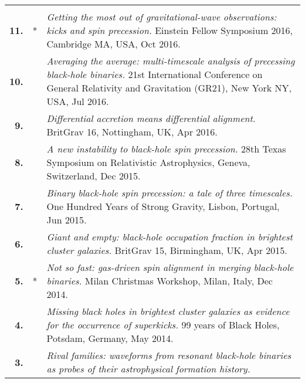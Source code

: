 \documentclass[11pt,letterpaper,sans]{moderncv}   %
\begin{document}
{\begin{longtable}{rp{0.4cm}p{15.8cm}}
\vspace{0.05cm}\\
\textbf{11.} & * & \textit{Getting the most out of gravitational-wave observations: kicks and spin precession.}
\newline{}Einstein Fellow Symposium 2016, Cambridge MA, USA, Oct 2016.
\vspace{0.05cm}\\
\textbf{10.} & & \textit{Averaging the average: multi-timescale analysis of precessing black-hole binaries.}
\newline{}21st International Conference on General Relativity and Gravitation (GR21), New York NY, USA, Jul 2016.
\vspace{0.05cm}\\
\textbf{9.} & & \textit{Differential accretion means differential alignment.}
\newline{}BritGrav 16, Nottingham, UK, Apr 2016.
\vspace{0.05cm}\\
\textbf{8.} & & \textit{A new instability to black-hole spin precession.}
\newline{}28th Texas Symposium on Relativistic Astrophysics, Geneva, Switzerland, Dec 2015.
\vspace{0.05cm}\\
\textbf{7.} & & \textit{Binary black-hole spin precession: a tale of three timescales.}
\newline{} 
One Hundred Years of Strong Gravity, Lisbon, Portugal, Jun 2015.
\vspace{0.05cm}\\
\textbf{6.} & & \textit{Giant and empty: black-hole occupation fraction in brightest cluster galaxies.}
\newline{} 
BritGrav 15, Birmingham, UK, Apr 2015.
\vspace{0.05cm}\\
\textbf{5.} & * & \textit{Not so fast: gas-driven spin alignment in merging black-hole binaries.}
\newline{} 
Milan Christmas Workshop, Milan, Italy, Dec 2014.
\vspace{0.05cm}\\
\textbf{4.} & & \textit{Missing black holes in brightest cluster galaxies as evidence for the occurrence of superkicks.}
\newline{} 
99 years of Black Holes, Potsdam, Germany, May 2014.
\vspace{0.05cm}\\
\textbf{3.} & & \textit{Rival families: waveforms from resonant black-hole binaries as probes of their astrophysical formation history.}

\end{longtable}}
\end{document}
